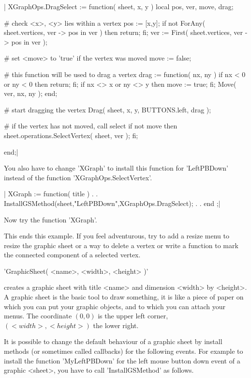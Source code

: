 |    XGraphOps.DragSelect := function( sheet, x, y )
        local   pos,  ver,  move,  drag;

        # check <x>, <y> lies within a vertex
        pos := [x,y];
        if not ForAny( sheet.vertices, ver -> pos in ver )  then
            return;
        fi;
        ver := First( sheet.vertices, ver -> pos in ver );

        # set <move> to 'true' if the vertex was moved
        move := false;

        # this function will be used to drag a vertex
        drag := function( nx, ny )
            if nx < 0 or ny < 0  then
                return;
            fi;
            if nx <> x or ny <> y  then
                move := true;
            fi;
            Move( ver, nx, ny );
        end;

        # start dragging the vertex
        Drag( sheet, x, y, BUTTONS.left, drag );

        # if the vertex has not moved, call select
        if not move  then
            sheet.operations.SelectVertex( sheet, ver );
        fi;

    end;|

You  also  have   to change   'XGraph'   to install  this  function   for
'LeftPBDown' instead of the function 'XGraphOps.SelectVertex'.

|    XGraph := function( title )
        .
        .
        InstallGSMethod(sheet,"LeftPBDown",XGraphOps.DragSelect);
        .
        .
    end ;|

Now try the function 'XGraph'.

This ends  this example.  If  you feel adventurous,  try to  add a resize
menu to resize the graphic  sheet or a way to  delete a vertex or write a
function to mark the connected component of a selected vertex.


'GraphicSheet( <name>, <width>, <height> )'

creates   a graphic  sheet with  title   <name> and dimension <width>  by
<height>.  A graphic sheet  is the basic  tool  to draw something, it  is
like a piece of  paper on which you can  put your graphic objects, and to
which  you can attach  your menus.   The coordinate  $(0,0)$ is the upper
left corner, $(<width>,<height>)$ the lower right.

It  is possible to change  the  default behaviour  of  a graphic sheet by
install methods (or sometimes called callbacks) for the following events.
For example to   install the function 'MyLeftPBDown'  for  the left mouse
button   down event   of   a   graphic   <sheet>,   you  have  to    call
'InstallGSMethod' as follows.


